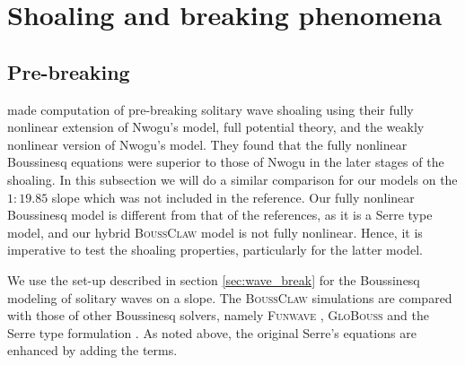 \documentclass[review]{elsarticle}
\newcommand{\BoussClaw}{\textsc{BoussClaw} }
\begin{document}
\section{Shoaling and breaking phenomena}
\subsection{Pre-breaking}
\label{sec:num_breaking}
\citet{wei1995fully} made computation of pre-breaking solitary wave shoaling using
 their fully nonlinear extension of Nwogu's model, full potential 
theory, and the weakly nonlinear version of Nwogu's model.
They found that the fully nonlinear Boussinesq equations were superior to those of Nwogu in the later stages of the shoaling.
In this subsection we will do a similar comparison for our models on the $1:19.85$ slope which was not included in the reference. Our fully nonlinear Boussinesq model is different from that of the references, as it is a Serre type model, 
and our hybrid \BoussClaw model is not fully nonlinear. Hence, it is imperative
to test the shoaling properties, particularly for the latter model.   
 
We use the set-up described in section \ref{sec:wave_break} for the Boussinesq modeling of solitary waves on a slope. 
The \BoussClaw simulations are compared
with those of other Boussinesq solvers, namely
 \textsc{Funwave} \citep{shi2012high}, \textsc{GloBouss} \citep{lovholt2010coupling} and the Serre type formulation \citep{Lovholt:2013a}.
As noted above, 
the original Serre's equations are enhanced by adding the \citet{schaffer1993boussinesq} terms. 
\end{document}
